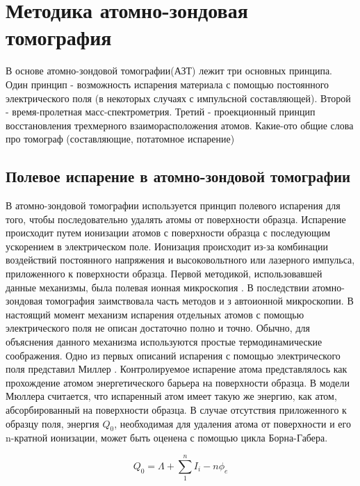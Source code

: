 \chapter{Методика атомно-зондовая томография}\label{ch:ch1}

В основе атомно-зондовой томографии(АЗТ) лежит три основных принципа. Один принцип - возможность испарения материала с помощью постоянного электрического поля (в некоторых случаях с импульсной составляющей). Второй - время-пролетная масс-спектрометрия. Третий - проекционный принцип восстановления трехмерного взаиморасположения атомов. Какие-ото общие слова про томограф (составляющие, потатомное испарение)

\section{Полевое испарение в атомно-зондовой томографии}\label{sec:ch1/sec1}

В атомно-зондовой томографии используется принцип полевого испарения для того, чтобы последовательно удалять атомы от поверхности образца. Испарение происходит путем ионизации атомов с поверхности образца с последующим ускорением в электрическом поле. Ионизация происходит из-за комбинации воздействий постоянного напряжения и высоковольтного или лазерного импульса, приложенного к поверхности образца. Первой методикой, использовавшей данные механизмы, была полевая ионная микроскопия \cite{Muller60}. В последствии атомно-зондовая томография заимствовала часть методов и з автоионной микроскопии.
В настоящий момент механизм испарения отдельных атомов с помощью электрического поля не описан достаточно полно и точно. Обычно, для объяснения данного механизма используются простые термодинамические соображения. Одно из первых описаний испарения с помощью электрического поля представил Миллер \cite{Muller56}. Контролируемое испарение атома представлялось как прохождение атомом энергетического барьера на поверхности образца. В модели Мюллера считается, что испаренный атом имеет такую же энергию, как атом, абсорбированный на поверхности образца. В случае отсутствия приложенного к образцу поля, энергия $Q_0$, необходимая для удаления атома от поверхности и его n-кратной ионизации, может быть оценена с помощью цикла Борна-Габера.

\begin{equation}
	\label{eq:equation1}
	Q_0 = \Lambda + \sum_{1}^{n} I_i -n\phi_e
\end{equation}

